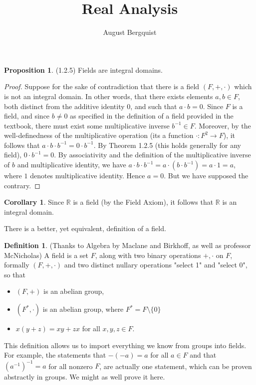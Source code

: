 \documentclass[11pt]{article}
\title{Real Analysis}
\author{August Bergquist}
\newcommand{\R}{\mathbb{R}}
\newcommand{\inv}[1]{{#1}^{-1}}
\theoremstyle{definition}
\newtheorem*{definition}{Definition}
\newtheorem{corollary}{Corollary}
\newtheorem{proposition}{Proposition}
\begin{document}
\maketitle

\begin{proposition} (1.2.5) Fields are integral domains.
\end{proposition}

\begin{proof}
Suppose for the sake of contradiction that there is a field $(F,+,\cdot)$ which is not an integral domain. In other words, that there exists elements $a,b\in F$, both distinct from the additive identity $0$, and such that $a\cdot b = 0$. Since $F$ is a field, and since $b\ne 0$ as specified in the definition of a field provided in the textbook, there must exist some multiplicative inverse $\inv{b}\in F$. Moreover, by the well-definedness of the multiplicative operation (its a function $\cdot : F^2\to F$), it follows that $a\cdot b \cdot \inv{b} = 0 \cdot \inv{b}$. By Theorem 1.2.5 (this holds generally for any field), $0 \cdot \inv{b} = 0$. By associativity and the definition of the multiplicative inverse of $b$ and multiplicative identity, we have $a\cdot b\cdot \inv{b} = a\cdot (b\cdot \inv{b}) = a\cdot 1 = a$, where $1$ denotes multiplicative identity. Hence $a = 0$. But we have supposed the contrary.
\end{proof}
 \begin{corollary}
 Since $\R$ is a field (by the Field Axiom), it follows that $\R$ is an integral domain.
 \end{corollary}
 
 There is a better, yet equivalent, definition of a field.
 
 \begin{definition} (Thanks to Algebra by Maclane and Birkhoff, as well as professor McNicholas)
 A field is a set $F$, along with two binary operations $+, \cdot$ on $F$, formally $(F, + , \cdot)$ and two distinct nullary operations "select 1" and "select 0", so that 
 \begin{itemize}
     \item $(F, +)$ is an abelian group,
     \item $(F^*, \cdot)$ is an abelian group, where $F^* = F \setminus \{0\}$
     \item $x(y + z) = xy + zx$ for all $x, y, z\in F$.
 \end{itemize}
 \end{definition}
 
 This definition allows us to import everything we know from groups into fields. For example, the statements that $-(-a) = a$ for all $a\in F$ and that $\inv{(\inv{a})} = a$ for all nonzero $F$, are actually one statement, which can be proven abstractly in groups. We might as well prove it here. 
 
\end{document}
